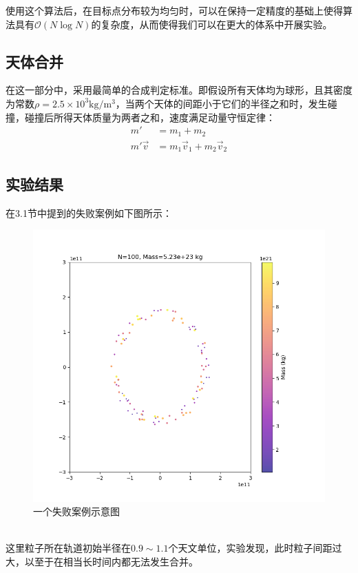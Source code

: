 \documentclass[hidelinks]{article}
\begin{document}
使用这个算法后，在目标点分布较为均匀时，可以在保持一定精度的基础上使得算法具有$\mathcal{O}(N\log N)$的复杂度，从而使得我们可以在更大的体系中开展实验。
\subsection{天体合并}
在这一部分中，采用最简单的合成判定标准。即假设所有天体均为球形，且其密度为常数$\rho=2.5\times10^3\mathrm{kg}/\mathrm{m}^3$，当两个天体的间距小于它们的半径之和时，发生碰撞，碰撞后所得天体质量为两者之和，速度满足动量守恒定律：
\begin{align*}
    m'&=m_1+m_2\\
    m'\vec{v}&=m_1\vec{v}_1+m_2\vec{v}_2
\end{align*}
\subsection{实验结果}
在3.1节中提到的失败案例如下图所示：
\begin{figure}
    \centering
    \includegraphics[width=0.5\linewidth]{images/Failure_exp.png}
    \caption{一个失败案例示意图}
\end{figure}
\\

这里粒子所在轨道初始半径在$0.9\sim1.1$个天文单位，实验发现，此时粒子间距过大，以至于在相当长时间内都无法发生合并。\\
\end{document}
